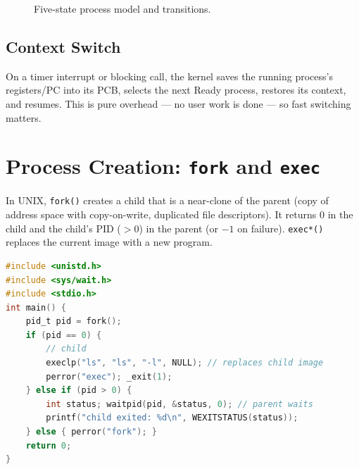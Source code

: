 \begin{figure}[h!]
\centering
{}
\caption{Five-state process model and transitions.}
\label{fig:proc-states}
\end{figure}

\subsection{Context Switch}
On a timer interrupt or blocking call, the kernel saves the running process's
registers/PC into its PCB, selects the next Ready process, restores its context,
and resumes. This is pure overhead --- no user work is done --- so fast
switching matters.

\section{Process Creation: \texttt{fork} and \texttt{exec}}
\label{sec:fork-exec}

In UNIX, \texttt{fork()} creates a child that is a near-clone of the parent
(copy of address space with copy-on-write, duplicated file descriptors). It
returns $0$ in the child and the child's PID ($>0$) in the parent (or $-1$ on
failure). \texttt{exec*()} replaces the current image with a new program.

\begin{lstlisting}[language=C,caption={fork--exec--wait pattern (POSIX)}]
#include <unistd.h>
#include <sys/wait.h>
#include <stdio.h>
int main() {
    pid_t pid = fork();
    if (pid == 0) {
        // child
        execlp("ls", "ls", "-l", NULL); // replaces child image
        perror("exec"); _exit(1);
    } else if (pid > 0) {
        int status; waitpid(pid, &status, 0); // parent waits
        printf("child exited: %d\n", WEXITSTATUS(status));
    } else { perror("fork"); }
    return 0;
}
\end{lstlisting}

